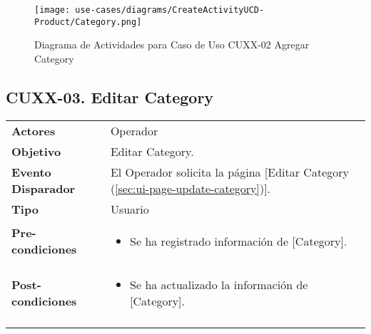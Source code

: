 	\begin{figure}[H]
		\begin{center}
			\label{tab:activity-create-ucd-entity-category}
			\texttt{[image: use-cases/diagrams/CreateActivityUCD-Product/Category.png]}
			\caption{Diagrama de Actividades para Caso de Uso CUXX-02 Agregar Category}	
	    \end{center}
	\end{figure}
			
	
	\clearpage
	\subsection{CUXX-03. Editar Category} \label{sec:cu-update-Category}
	
	\begin{tabular}{ p{3.5cm} p{11.5cm} }
		\textbf{Actores} & Operador\\
		\textbf{Objetivo} & Editar Category.\\
		\textbf{Evento Disparador} & El Operador solicita la p\'agina [Editar Category (\ref{sec:ui-page-update-category})].\\
		\textbf{Tipo} & Usuario\\
		\textbf{Pre-condiciones} &
			\begin{minipage}[t]{0.6\textwidth}
			\begin{itemize}[noitemsep,nolistsep]
			\setlength{\itemindent}{-.5cm}
				\item Se ha registrado informaci\'on de [Category].
			\end{itemize}
			\end{minipage} \\
		\textbf{Post-condiciones} &
			\begin{minipage}[t]{0.6\textwidth}
			\begin{itemize}[noitemsep,nolistsep]
			\setlength{\itemindent}{-.5cm}
				\item Se ha actualizado la informaci\'on de [Category].
			\end{itemize}
			\end{minipage} \\
		\\
	\end{tabular}
	
